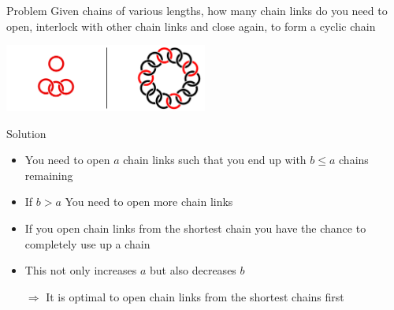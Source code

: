 \begin{frame}
    \frametitle{\problemtitle}
    \begin{block}{Problem}
    	Given chains of various lengths, how many chain links do you need to open, interlock with other chain links and close again, to form a cyclic chain
    \end{block}
	\centering
	\includegraphics[width=0.5\textwidth]{example}
	\pause
    \begin{block}{Solution}
    	\begin{itemize}
    		\item You need to open $a$ chain links such that you end up with $b\leq a$ chains remaining
    		\pause
    		\item If $b>a$ You need to open more chain links
    		\pause
    		\item If you open chain links from the shortest chain you have the chance to completely use up a chain
    		\item This not only increases $a$ but also decreases $b$
    		\pause
    		\item[$\Rightarrow$] It is optimal to open chain links from the shortest chains first
    	\end{itemize}
    \end{block}
\end{frame}
